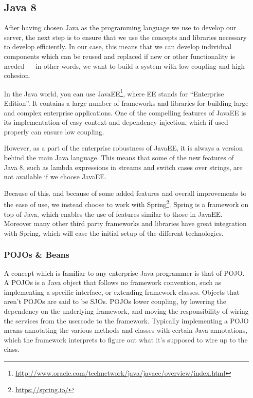 \subsection{Java 8}
After having chosen Java as the programming language we use to develop our server, the next step is to ensure that we use the concepts and libraries necessary to develop efficiently.
In our case, this means that we can develop individual components which can be reused and replaced if new or other functionality is needed --- in other words, we want to build a system with low coupling and high cohesion.

In the Java world, you can use JavaEE\footnote{\url{http://www.oracle.com/technetwork/java/javaee/overview/index.html}}, where EE stands for ``Enterprise Edition''.
It contains a large number of frameworks and libraries for building large and complex enterprise applications.
One of the compelling features of JavaEE is its implementation of easy context and dependency injection, which if used properly can ensure low coupling.

However, as a part of the enterprise robustness of JavaEE, it is always a version behind the main Java language.
This means that some of the new features of Java 8, such as lambda expressions in streams and switch cases over strings, are not available if we choose JavaEE.

Because of this, and because of some added features and overall improvements to the ease of use, we instead choose to work with Spring\footnote{\url{https://spring.io/}}.
Spring is a framework on top of Java, which enables the use of features similar to those in JavaEE.
Moreover many other third party frameworks and libraries have great integration with Spring, which will ease the initial setup of the different technologies.

\subsubsection{POJOs \& Beans}
A concept which is familiar to any enterprise Java programmer is that of \ac{POJO}.
A \acp{POJO} is a Java object that follows no framework convention, such as implementing a specific interface, or extending framework classes.
Objects that aren't \acp{POJO} are said to be \acp{SJO}.
\acp{POJO} lower coupling, by lowering the dependency on the underlying framework, and moving the responsibility of wiring the services from the usercode to the framework.
Typically implementing a \ac{POJO} means annotating the various methods and classes with certain Java annotations, which the framework interprets to figure out what it's supposed to wire up to the class.\cite{spring_pojo}

